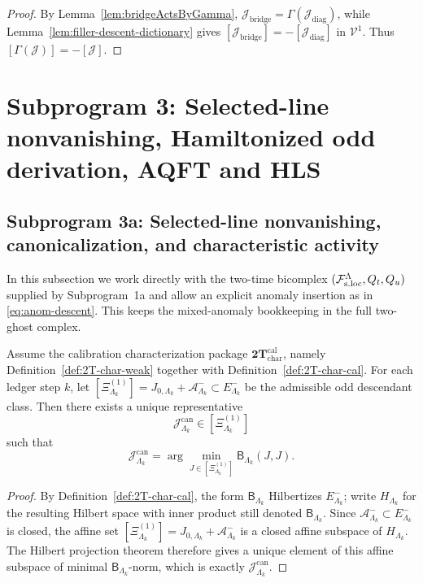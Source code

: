 \begin{proof}
By Lemma~\ref{lem:bridgeActsByGamma},
$\mathcal J_{\mathrm{bridge}}=\Gamma(\mathcal J_{\mathrm{diag}})$,
while Lemma~\ref{lem:filler-descent-dictionary} gives
$[\mathcal J_{\mathrm{bridge}}]=-[\mathcal J_{\mathrm{diag}}]$ in
$\mathcal V^1$. Thus $[\Gamma(\mathcal J)]=-[\mathcal J]$.
\end{proof}

\section{Subprogram 3: Selected-line nonvanishing, Hamiltonized odd derivation, AQFT and HLS}
\label{sec:subprogram3}

\subsection{Subprogram 3a: Selected-line nonvanishing, canonicalization, and characteristic activity}
\label{sec:subprogram3a}

In this subsection we work directly with the two-time bicomplex
\((\mathcal F_{\mathrm{s.loc}}^\Lambda,Q_t,Q_u)\) supplied by Subprogram~1a and allow an explicit anomaly
insertion as in \eqref{eq:anom-descent}. This keeps the mixed-anomaly
bookkeeping in the full two-ghost complex.

\begin{theorem}
\label{thm:finite-cutoff-Jcan}
Assume the calibration characterization package
\(\mathbf{2T}_{\mathrm{char}}^{\mathrm{cal}}\), namely
Definition~\ref{def:2T-char-weak} together with
Definition~\ref{def:2T-char-cal}. For each ledger step \(k\), let
\(
[\Xi^{(1)}_{\Lambda_k}]=J_{0,\Lambda_k}+\mathcal A^-_{\Lambda_k}\subset E^-_{\Lambda_k}
\)
be the admissible odd descendant class. Then there exists a unique
representative
\[
\mathcal J^{\mathrm{can}}_{\Lambda_k}\in [\Xi^{(1)}_{\Lambda_k}]
\]
such that
\begin{equation}
\mathcal J^{\mathrm{can}}_{\Lambda_k}
=
\arg\min_{J\in [\Xi^{(1)}_{\Lambda_k}]}
\mathsf B_{\Lambda_k}(J,J).
\label{eq:Jcan-min}
\end{equation}
\end{theorem}

\begin{proof}
By Definition~\ref{def:2T-char-cal}, the form \(\mathsf B_{\Lambda_k}\) Hilbertizes
\(E^-_{\Lambda_k}\); write \(H_{\Lambda_k}\) for the resulting Hilbert space with
inner product still denoted \(\mathsf B_{\Lambda_k}\).
Since \(\mathcal A^-_{\Lambda_k}\subset E^-_{\Lambda_k}\) is closed, the affine set
\(
[\Xi^{(1)}_{\Lambda_k}]=J_{0,\Lambda_k}+\mathcal A^-_{\Lambda_k}
\)
is a closed affine subspace of \(H_{\Lambda_k}\). The Hilbert projection theorem
therefore gives a unique element of this affine subspace of minimal
\(\mathsf B_{\Lambda_k}\)-norm, which is exactly
\(\mathcal J^{\mathrm{can}}_{\Lambda_k}\).
\end{proof}

